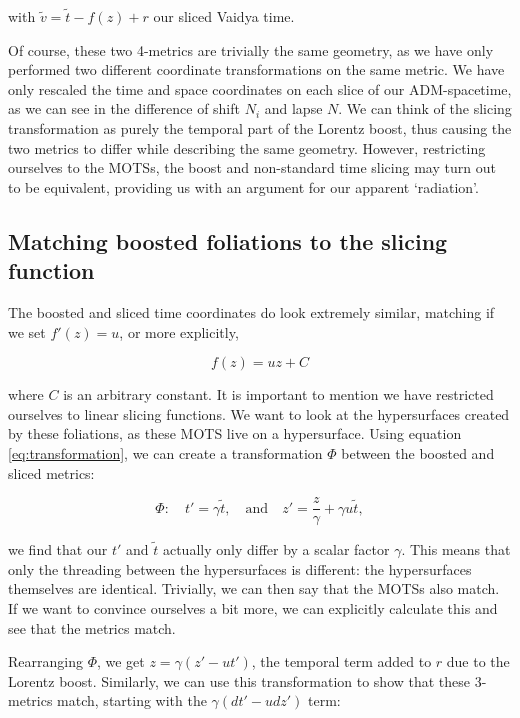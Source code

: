 \documentclass[twoside, openright]{RadboudReport}
\begin{document}
with $\tilde{v} = \tilde{t} - f(z) + r$ our sliced Vaidya time.\newline

Of course, these two 4-metrics are trivially the same geometry, as we have only performed two different coordinate transformations on the same metric. We have only rescaled the time and space coordinates on each slice of our ADM-spacetime, as we can see in the difference of shift $N_i$ and lapse $N$. We can think of the slicing transformation as purely the temporal part of the Lorentz boost, thus causing the two metrics to differ while describing the same geometry. However, restricting ourselves to the MOTSs, the boost and non-standard time slicing may turn out to be equivalent, providing us with an argument for our apparent `radiation'.

\subsection{Matching boosted foliations to the slicing function}

The boosted and sliced time coordinates do look extremely similar, matching if we set $f'(z) = u$, or more explicitly, 

\begin{equation}
	f(z) = uz + C
	\label{eq:transformation}
\end{equation} 

where $C$ is an arbitrary constant. It is important to mention we have restricted ourselves to linear slicing functions.  We want to look at the hypersurfaces created by these foliations, as these MOTS live on a hypersurface. Using equation \ref{eq:transformation}, we can create a transformation $\Phi$ between the boosted and sliced metrics:

\begin{equation}
	\Phi: \quad t' = \gamma \tilde{t}, \quad \text{and} \quad z' = \frac{z}{\gamma} + \gamma u \tilde{t},
\end{equation}

we find that our $t'$ and $\tilde{t}$ actually only differ by a scalar factor $\gamma$. This means that only the threading between the hypersurfaces is different: the hypersurfaces themselves are identical. Trivially, we can then say that the MOTSs also match. If we want to convince ourselves a bit more, we can explicitly calculate this and see that the metrics match. \newline

Rearranging $\Phi$, we get $z = \gamma(z' - ut')$, the temporal term added to $r$ due to the Lorentz boost. Similarly, we can use this transformation to show that these 3-metrics match, starting with the $\gamma(dt' -udz')$ term:
\end{document}
